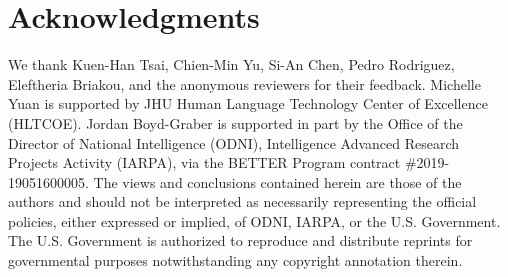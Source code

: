 \section*{Acknowledgments}

We thank Kuen-Han Tsai, Chien-Min Yu, Si-An Chen, Pedro Rodriguez, Eleftheria
Briakou, and the anonymous reviewers for their feedback.
Michelle Yuan is supported by JHU Human Language Technology Center of Excellence (HLTCOE).
Jordan Boyd-Graber is supported in part by the Office of the Director of National Intelligence (ODNI), Intelligence Advanced Research Projects Activity (IARPA), via the BETTER Program contract \#2019-19051600005. The views and conclusions contained herein are those of the authors and should not be interpreted as necessarily representing the official policies, either expressed or implied, of ODNI, IARPA, or the U.S. Government. The U.S. Government is authorized to reproduce and distribute reprints for governmental purposes notwithstanding any copyright annotation therein.

